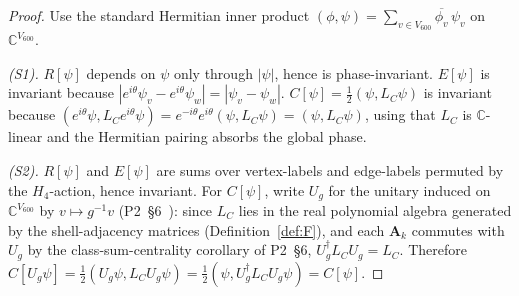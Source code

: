\documentclass[11pt]{article}
\theoremstyle{definition}
\newcommand{\C}{\mathbb{C}}
\begin{document}
\begin{proof}
Use the standard Hermitian inner product $(\phi, \psi) = \sum_{v \in V_{600}} \overline{\phi_v}\,\psi_v$ on $\C^{V_{600}}$.

\emph{(S1).} $R[\psi]$ depends on $\psi$ only through $|\psi|$, hence is phase-invariant. $E[\psi]$ is invariant because $|e^{i\theta}\psi_v - e^{i\theta}\psi_w| = |\psi_v - \psi_w|$. $C[\psi] = \tfrac{1}{2}(\psi, L_C\psi)$ is invariant because $(e^{i\theta}\psi, L_C e^{i\theta}\psi) = e^{-i\theta} e^{i\theta}(\psi, L_C\psi) = (\psi, L_C\psi)$, using that $L_C$ is $\C$-linear and the Hermitian pairing absorbs the global phase.

\emph{(S2).} $R[\psi]$ and $E[\psi]$ are sums over vertex-labels and edge-labels permuted by the $H_4$-action, hence invariant. For $C[\psi]$, write $U_g$ for the unitary induced on $\C^{V_{600}}$ by $v \mapsto g^{-1}v$ (P2~\S 6~\citep{CascadeAlgSubstrate}): since $L_C$ lies in the real polynomial algebra generated by the shell-adjacency matrices (Definition~\ref{def:F}), and each $\mathbf A_k$ commutes with $U_g$ by the class-sum-centrality corollary of P2~\S 6, $U_g^\dagger L_C U_g = L_C$. Therefore $C[U_g \psi] = \tfrac{1}{2}(U_g\psi, L_C U_g\psi) = \tfrac{1}{2}(\psi, U_g^\dagger L_C U_g \psi) = C[\psi]$.
\end{proof}
\end{document}
